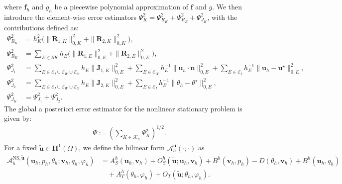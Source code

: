 \documentclass[10pt,a4paper]{article}
\begin{document}
where $\boldsymbol{f}_h$ and $g_h$ be a piecewise polynomial approximation of $\boldsymbol{f}$ and $g$. We then introduce the element-wise error estimators \( \Psi_K^2 = \Psi_{R_K}^2 + \Psi_{R_E}^2 + \Psi_{J_K}^2 \), with the contributions defined as:
\begin{align*}
    \Psi_{R_K}^2 &= h_K^2 \bigl(\| \boldsymbol{R}_{1,K} \|_{0,K}^2 + \| \boldsymbol{R}_{2,K} \|_{0,K}^2 \bigr), \\
    \Psi_{R_E}^2 &= \sum_{E \in \partial K } h_E  \bigl(  \| \boldsymbol{R}_{1,E} \|_{0,E}^2 + \| \boldsymbol{R}_{2,E} \|_{0,E}^2   \bigr), \\
    \Psi_{J_1}^2 &= \sum_{E \in \mathcal{E}_I \cup \mathcal{E}_W \cup  \mathcal{E}_O} h_E   \| \boldsymbol{J}_{1,K} \|_{0,E}^2  + \sum_{E \in \mathcal{E}_W} h_E^{-1} \| \boldsymbol{u}_h \cdot \boldsymbol{n} \|^2_{0,E} + \sum_{E \in \mathcal{E}_I} h_E^{-1} \| \boldsymbol{u}_h - \boldsymbol{u}^{\star} \|^2_{0,E}, \\
    \Psi_{J_2}^2 &= \sum_{E \in \mathcal{E}_I \cup \mathcal{E}_W \cup  \mathcal{E}_O} h_E  \| \boldsymbol{J}_{2,K} \|_{0,E}^2 + \sum_{E \in \mathcal{E}_I} h_E^{-1} \| \theta_h - \theta^{\star} \|^2_{0,E}, \\
    \Psi_{J_K}^2 &= \Psi_{J_1}^2 + \Psi_{J_2}^2.
\end{align*}
The global a posteriori error estimator for the nonlinear stationary problem is given by:
\begin{align}\label{total_estimate}
    \Psi := \left( \sum_{K \in \mathcal{K}_h} \Psi_K^2 \right)^{1/2}.
\end{align}
For a fixed $\boldsymbol{\tilde{u}} \in \boldsymbol{H}^1(\Omega)$, we define the bilinear form $\mathcal{A}_h^{\boldsymbol{\tilde{u}}} \left( \cdot ; \cdot \right)$ as 
\begin{align*}
\mathcal{A}_h^{\mathrm{NS},\boldsymbol{\tilde{u}}} \left( \boldsymbol{u}_h,  p_h, \theta_h ;  \boldsymbol{v}_h,  q_h, \varphi_h \right) & = {A}_S^h(\boldsymbol{u}_h, \boldsymbol{v}_h) + {O}_S^h(\boldsymbol{\tilde{u}} ; \boldsymbol{u}_h, \boldsymbol{v}_h) + {B}^h(\boldsymbol{v}_h,p_h) - D(\theta_h,\boldsymbol{v}_h) + {B}^h(\boldsymbol{u}_h, q_h) \\ & \quad + {A}^h_T(\theta_h,\varphi_h)   + O_T(\boldsymbol{\tilde{u}}; \theta_h, \varphi_h).
\end{align*}
\end{document}
